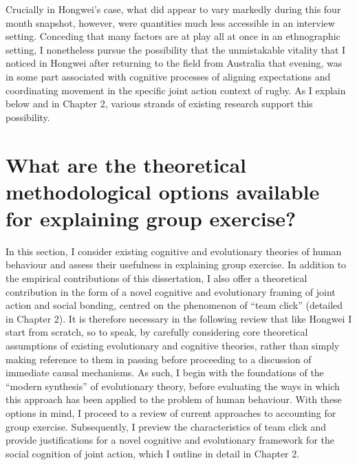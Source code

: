 Crucially in Hongwei's case, what did appear to vary markedly during this four month snapshot, however, were quantities much less accessible in an interview setting. Conceding that many factors are at play all at once in an ethnographic setting, I nonetheless pursue the possibility that the unmistakable vitality that I noticed in Hongwei after returning to the field from Australia that evening, was in some part associated with cognitive processes of aligning expectations and coordinating movement in the specific joint action context of rugby.  As I explain below and in Chapter 2, various strands of existing research support this possibility.


\section{What are the theoretical methodological options available for explaining group exercise?}
In this section, I consider existing cognitive and evolutionary theories of human behaviour and assess their usefulness in explaining group exercise. In addition to the empirical contributions of this dissertation, I also offer a theoretical contribution in the form of a novel cognitive and evolutionary framing of joint action and social bonding, centred on the phenomenon of ``team click'' (detailed in Chapter 2). It is therefore necessary in the following review that like Hongwei I start from scratch, so to speak, by carefully considering core theoretical assumptions of existing evolutionary and cognitive theories, rather than simply making reference to them in passing before proceeding to a discussion of immediate causal mechanisms.  As such, I begin with the foundations of the ``modern synthesis'' of evolutionary theory, before evaluating the ways in which this approach has been applied to the problem of human behaviour.  With these options in mind, I proceed to a review of current approaches to accounting for group exercise.  Subsequently, I preview the characteristics of team click and provide justifications for a novel cognitive and evolutionary framework for the social cognition of joint action, which I outline in detail in Chapter 2.

